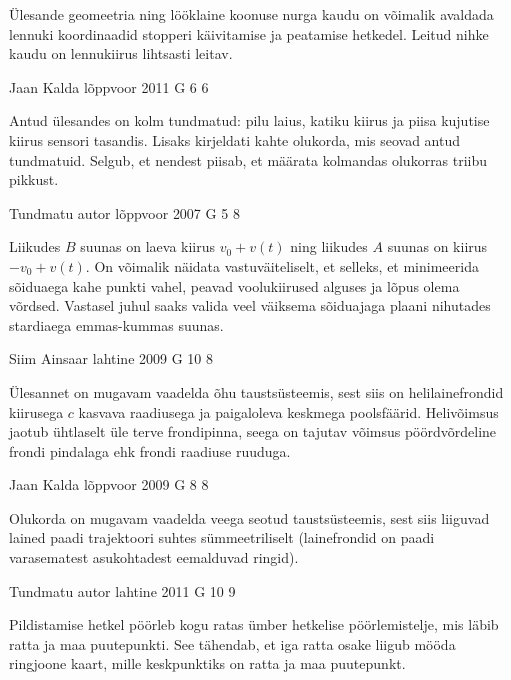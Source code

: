 \documentclass[11pt, twoside]{article}
\begin{document}
{{\ifHint
Ülesande geomeetria ning lööklaine koonuse nurga kaudu on võimalik avaldada lennuki koordinaadid stopperi käivitamise ja peatamise hetkedel. Leitud nihke kaudu on lennukiirus lihtsasti leitav.
\fi
}

{Jaan Kalda} %
{lõppvoor} %
{2011} %
{G 6} %
{6} %
{

\ifHint
Antud ülesandes on kolm tundmatud: pilu laius, katiku kiirus ja piisa kujutise kiirus sensori tasandis. Lisaks kirjeldati kahte olukorda, mis seovad antud tundmatuid. Selgub, et nendest piisab, et määrata kolmandas olukorras triibu pikkust.
\fi
}

{Tundmatu autor} %
{lõppvoor} %
{2007} %
{G 5} %
{8} %
{

\ifHint
Liikudes $B$ suunas on laeva kiirus $v_0 + v(t)$ ning liikudes $A$ suunas on kiirus $-v_0 + v(t)$. On võimalik näidata vastuväiteliselt, et selleks, et minimeerida sõiduaega kahe punkti vahel, peavad voolukiirused alguses ja lõpus olema võrdsed. Vastasel juhul saaks valida veel väiksema sõiduajaga plaani nihutades stardiaega emmas-kummas suunas.
\fi
}

{Siim Ainsaar} %
{lahtine} %
{2009} %
{G 10} %
{8} %
{

\ifHint
Ülesannet on mugavam vaadelda õhu taustsüsteemis, sest siis on helilainefrondid kiirusega $c$ kasvava raadiusega ja paigaloleva keskmega poolsfäärid. Helivõimsus jaotub ühtlaselt üle terve frondipinna, seega on tajutav võimsus pöördvõrdeline frondi pindalaga ehk frondi raadiuse ruuduga.
\fi
}

{Jaan Kalda} %
{lõppvoor} %
{2009} %
{G 8} %
{8} %
{

\ifHint
Olukorda on mugavam vaadelda veega seotud taustsüsteemis, sest siis liiguvad lained paadi trajektoori suhtes sümmeetriliselt (lainefrondid on paadi varasematest asukohtadest eemalduvad ringid).
\fi
}

{Tundmatu autor} %
{lahtine} %
{2011} %
{G 10} %
{9} %
{

\ifHint
Pildistamise hetkel pöörleb kogu ratas ümber hetkelise pöörlemistelje, mis läbib
ratta ja maa puutepunkti. See tähendab, et iga ratta osake liigub mööda ringjoone kaart, mille keskpunktiks on ratta ja maa puutepunkt.
\fi
}

}
\end{document}
